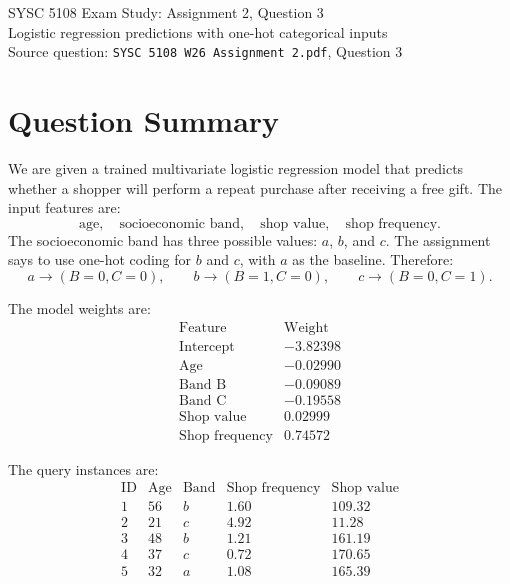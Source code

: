 \documentclass[11pt]{article}
\begin{document}
\begin{center}
{\Large SYSC 5108 Exam Study: Assignment 2, Question 3}\\
\vspace{0.3em}
{\large Logistic regression predictions with one-hot categorical inputs}\\
\vspace{0.3em}
Source question: \texttt{SYSC 5108 W26 Assignment 2.pdf}, Question 3
\end{center}

\section*{Question Summary}

We are given a trained multivariate logistic regression model that predicts whether a shopper will perform a repeat purchase after receiving a free gift. The input features are:
\[
\text{age},\quad \text{socioeconomic band},\quad \text{shop value},\quad \text{shop frequency}.
\]
The socioeconomic band has three possible values: $a$, $b$, and $c$. The assignment says to use one-hot coding for $b$ and $c$, with $a$ as the baseline. Therefore:
\[
a \rightarrow (B=0,C=0),\qquad
b \rightarrow (B=1,C=0),\qquad
c \rightarrow (B=0,C=1).
\]

The model weights are:
\[
\begin{array}{c|r}
\text{Feature} & \text{Weight}\\
\hline
\text{Intercept} & -3.82398\\
\text{Age} & -0.02990\\
\text{Band B} & -0.09089\\
\text{Band C} & -0.19558\\
\text{Shop value} & 0.02999\\
\text{Shop frequency} & 0.74572
\end{array}
\]

The query instances are:
\[
\begin{array}{c|r|c|r|r}
\text{ID} & \text{Age} & \text{Band} & \text{Shop frequency} & \text{Shop value}\\
\hline
1 & 56 & b & 1.60 & 109.32\\
2 & 21 & c & 4.92 & 11.28\\
3 & 48 & b & 1.21 & 161.19\\
4 & 37 & c & 0.72 & 170.65\\
5 & 32 & a & 1.08 & 165.39
\end{array}
\]
\end{document}
